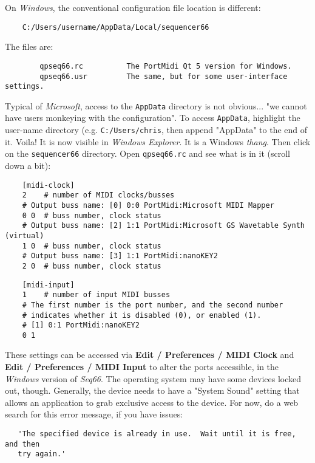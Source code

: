     On \textsl{Windows}, the conventional configuration file
    location is different:
    
\begin{verbatim}
    C:/Users/username/AppData/Local/sequencer66
\end{verbatim}

    The files are:

\begin{verbatim}
        qpseq66.rc          The PortMidi Qt 5 version for Windows.
        qpseq66.usr         The same, but for some user-interface settings.
\end{verbatim}

    Typical of \textsl{Microsoft}, access to the \texttt{AppData} directory
    is not obvious... "we cannot have users monkeying with the configuration".
    To access \texttt{AppData}, highlight the user-name directory
    (e.g. \texttt{C:/Users/chris}, then append
    "AppData" to the end of it.  Voila! It is now visible in
    \textsl{Windows Explorer}.
    It is a Windows \textsl{thang}.
    Then click on the \texttt{sequencer66} directory.
    Open \texttt{qpseq66.rc} and see what is in it (scroll down a bit):

\begin{verbatim}
    [midi-clock]
    2    # number of MIDI clocks/busses
    # Output buss name: [0] 0:0 PortMidi:Microsoft MIDI Mapper
    0 0  # buss number, clock status
    # Output buss name: [2] 1:1 PortMidi:Microsoft GS Wavetable Synth (virtual)
    1 0  # buss number, clock status
    # Output buss name: [3] 1:1 PortMidi:nanoKEY2
    2 0  # buss number, clock status
\end{verbatim}
    
\begin{verbatim}
    [midi-input]
    1    # number of input MIDI busses
    # The first number is the port number, and the second number
    # indicates whether it is disabled (0), or enabled (1).
    # [1] 0:1 PortMidi:nanoKEY2
    0 1
\end{verbatim}

   These settings can be accessed via
   \textbf{Edit / Preferences / MIDI Clock} and
   \textbf{Edit / Preferences / MIDI Input} to
	alter the ports accessible, in the \textsl{Windows}
   version of \textsl{Seq66}.
   The operating system may have some devices locked out, though.
   Generally, the device needs to have a "System Sound" setting that allows an
   application to grab exclusive access to the device.
   For now, do a web search for this error message, if you have issues:

\begin{verbatim}
   'The specified device is already in use.  Wait until it is free, and then
   try again.'
\end{verbatim}

